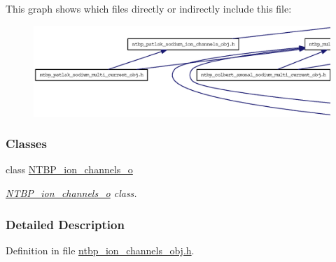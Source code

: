 This graph shows which files directly or indirectly include this file:
\nopagebreak
\begin{figure}[H]
\begin{center}
\leavevmode
\includegraphics[width=400pt]{ntbp__ion__channels__obj_8h__dep__incl}
\end{center}
\end{figure}
\subsubsection*{Classes}
\begin{DoxyCompactItemize}
\item 
class \hyperlink{class_n_t_b_p__ion__channels__o}{NTBP\_\-ion\_\-channels\_\-o}
\begin{DoxyCompactList}\small\item\em \hyperlink{class_n_t_b_p__ion__channels__o}{NTBP\_\-ion\_\-channels\_\-o} class. \item\end{DoxyCompactList}\end{DoxyCompactItemize}


\subsubsection{Detailed Description}


Definition in file \hyperlink{ntbp__ion__channels__obj_8h_source}{ntbp\_\-ion\_\-channels\_\-obj.h}.

